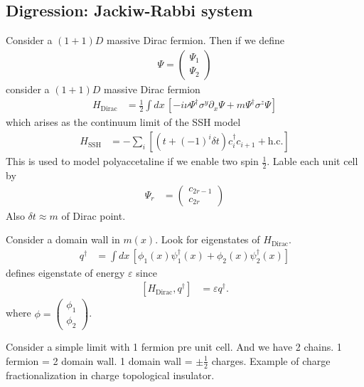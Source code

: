 \subsection{Digression: Jackiw-Rabbi system}
Consider a $(1 + 1)D$ massive Dirac fermion.
Then if we define
\begin{align}
    \Psi =
    \begin{pmatrix}
        \Psi_1\\
        \Psi_2
    \end{pmatrix}
\end{align}
consider a $(1+1)D$ massive Dirac fermion
\begin{align}
    H_{\textrm{Dirac}} &=
    \frac{1}{2}\int dx\,\left[
    -i \nu \Psi^\dagger \sigma^y \partial_x \Psi
    + m\Psi^\dagger \sigma^z \Psi
    \right]
\end{align}
which arises as the continuum limit of the SSH model
\begin{align}
    H_{\mathrm{SSH}} &=
    -\sum_{i}\left[
    \left( t + {(-1)}^{i} \delta t \right) c_i^\dagger c_{i+1} + \textrm{h.c.}
    \right]
\end{align}
This is used to model polyaccetaline if we enable two spin $\frac{1}{2}$.
Lable each unit cell by
\begin{align}
    \Psi_r &=
    \begin{pmatrix}
        c_{2r - 1}\\
        c_{2r}
    \end{pmatrix}
\end{align}
Also $\delta t \approx m$ of Dirac point.

Consider a domain wall in $m(x)$.
Look for eigenstates of $H_{\textrm{Dirac}}$.
\begin{align}
    q^\dagger &= \int dx\,\left[ 
    \phi_1(x) \psi_1^\dagger(x)
    + \phi_2(x) \psi_2^\dagger(x)
    \right]
\end{align}
defines eigenstate of energy $\varepsilon$ since
\begin{align}
    \left[ H_{\mathrm{Dirac}}, q^\dagger \right] &=
    \varepsilon q^\dagger.
\end{align}
where $\phi =
\begin{pmatrix}
    \phi_1\\
    \phi_2
\end{pmatrix}$.

Consider a simple limit with 1 fermion pre unit cell.
And we have 2 chains.
1 fermion = 2 domain wall.
1 domain wall = $\pm\frac{1}{2}$ charges.
Example of charge fractionalization in charge topological insulator.

